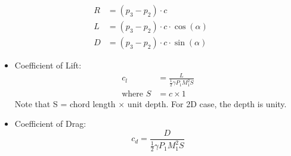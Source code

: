 \begin{align*}
    R &= (p_3 - p_2 ) \cdot c \\
    L &= (p_3 - p_2 ) \cdot c \cdot \cos(\alpha) \\
    D &= (p_3 - p_2 ) \cdot c \cdot \sin(\alpha)
\end{align*}

\begin{itemize}
    \item Coefficient of Lift:
    \begin{align*}
        c_l &= \frac{L}{\frac{1}{2}\gamma P_1 M_1^2 S} \\
        \text{where } S &= c \times 1
    \end{align*}
    Note that S = chord length $\times$ unit depth. For 2D case, the depth is unity.
    \item Coefficient of Drag:
    \begin{equation*}
        c_d = \frac{D}{\frac{1}{2}\gamma P_1 M_1^2 S}
    \end{equation*}
\end{itemize}